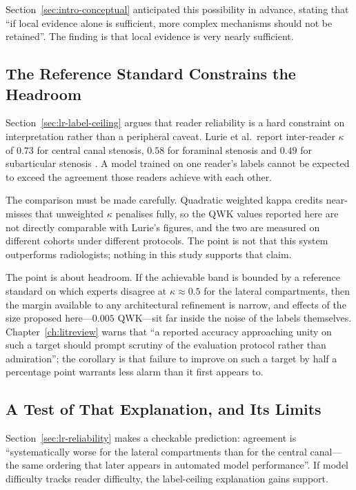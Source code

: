 \documentclass[12pt,a4paper]{report}
\begin{document}
Section~\ref{sec:intro-conceptual} anticipated this possibility in advance,
stating that \enquote{if local evidence alone is sufficient, more complex
mechanisms should not be retained}. The finding is that local evidence is very
nearly sufficient.

\subsection{The Reference Standard Constrains the Headroom}
\label{sec:disc-ceiling}

Section~\ref{sec:lr-label-ceiling} argues that reader reliability is a hard
constraint on interpretation rather than a peripheral caveat. Lurie et al.\
report inter-reader $\kappa$ of $0.73$ for central canal stenosis, $0.58$ for
foraminal stenosis and $0.49$ for subarticular stenosis
\cite{lurie2008reliability}. A model trained on one reader's labels cannot be
expected to exceed the agreement those readers achieve with each other.

The comparison must be made carefully. Quadratic weighted kappa credits
near-misses that unweighted $\kappa$ penalises fully, so the QWK values reported
here are not directly comparable with Lurie's figures, and the two are measured
on different cohorts under different protocols. The point is not that this
system outperforms radiologists; nothing in this study supports that claim.

The point is about headroom. If the achievable band is bounded by a reference
standard on which experts disagree at $\kappa \approx 0.5$ for the lateral
compartments, then the margin available to any architectural refinement is
narrow, and effects of the size proposed here---$0.005$ QWK---sit far inside the
noise of the labels themselves. Chapter~\ref{ch:litreview} warns that
\enquote{a reported accuracy approaching unity on such a target should prompt
scrutiny of the evaluation protocol rather than admiration}; the corollary is
that failure to improve on such a target by half a percentage point warrants
less alarm than it first appears to.

\subsection{A Test of That Explanation, and Its Limits}
\label{sec:disc-ordering}

Section~\ref{sec:lr-reliability} makes a checkable prediction: agreement is
\enquote{systematically worse for the lateral compartments than for the central
canal---the same ordering that later appears in automated model performance}.
If model difficulty tracks reader difficulty, the label-ceiling explanation
gains support.
\end{document}
